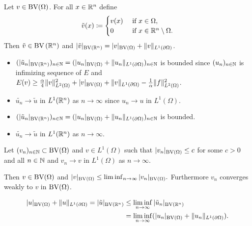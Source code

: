 \documentclass[xcolor=svgnames,english]{beamer}
\begin{document}
\begin{frame}

  \begin{block}{}
    Let $v\in\textup{BV}(\Omega)$.
    For all $x\in\mathbb{R}^n$ define
    \begin{align*}
      \tilde{v}(x)\coloneqq
      \begin{cases}
        v(x)  &\text{ if } x\in\Omega,\\
        0     &\text{ if } x\in\mathbb{R}^n\setminus\Omega.
      \end{cases} 
    \end{align*}
    Then $\tilde{v}\in\textup{BV}\left(\mathbb{R}^n\right)$ and
    $|\tilde{v}|_{\textup{BV}\left(\mathbb{R}^n\right)}
    = |v|_{\textup{BV}(\Omega)}+\Vert v\Vert_{L^1(\partial\Omega)}$.
  \end{block}

  \pause 
  \begin{itemize}[label=$\bullet$]
    \item 
      $(|\tilde{u}_n|_{\textup{BV}(\mathbb{R}^n)})_{n\in\mathbb{N}} = (|u_n|_{\textup{BV}(\Omega)}+\Vert
      u_n\Vert_{L^1(\partial\Omega)})_{n\in\mathbb{N}}$ is bounded since 
      $(u_n)_{n\in\mathbb{N}}$ is infimizing sequence of $E$ and
      $E(v)\geq 
      \frac{\alpha}{4}\Vert v\Vert_{L^2(\Omega)}^2 + |v|_{\textup{BV}(\Omega)}
      +\Vert v\Vert_{L^1(\partial\Omega)}-\frac{1}{\alpha}\Vert
      f\Vert_{L^2(\Omega)}^2$.
      \pause
    \item $\tilde{u_n}\to\tilde{u}$ in $L^1(\mathbb{R}^n)$ as $n\to\infty$ since
      $u_n\to u$ in $L^1(\Omega)$.
  \end{itemize}
\end{frame}

\begin{frame}
  \begin{itemize}[label=$\bullet$]
    \item 
      $(|\tilde{u}_n|_{\textup{BV}(\mathbb{R}^n)})_{n\in\mathbb{N}} = (|u_n|_{\textup{BV}(\Omega)}+\Vert
      u_n\Vert_{L^1(\partial\Omega)})_{n\in\mathbb{N}}$ is bounded.
      \pause
    \item $\tilde{u_n}\to\tilde{u}$ in $L^1(\mathbb{R}^n)$ as $n\to\infty$.
  \end{itemize}
  \pause
  \begin{block}{}
    Let $(v_n)_{n\in\mathbb{N}}\subset\textup{BV}(\Omega)$ and $v\in L^1(\Omega)$ such that
    $|v_n|_{\textup{BV}(\Omega)}\leq c$ for some $c>0$ and all $n\in\mathbb{N}$ and
    $v_n\rightarrow v$ in $L^1(\Omega)$ as $n\rightarrow\infty$.

    Then $v\in\textup{BV}(\Omega)$ and $|v|_{\textup{BV}(\Omega)}\leq
    \liminf_{n\rightarrow\infty}|v_n|_{\textup{BV}(\Omega)}.$
    Furthermore $v_n$ converges weakly to $v$ in $\textup{BV}(\Omega)$.
  \end{block}
  \pause
  \begin{align*}
    |u|_{\textup{BV}(\Omega)} +\Vert u\Vert_{L^1(\partial\Omega)}
    = |\tilde{u}|_{\textup{BV}(\mathbb{R}^n)}
    &\leq\liminf_{n\to\infty} |\tilde{u}_n|_{\textup{BV}(\mathbb{R}^n)}\\
    &= \liminf_{n\to\infty} (|u_n|_{\textup{BV}(\Omega)} +
    \Vert u_n\Vert_{L^1(\partial\Omega)}).
  \end{align*}
\end{frame}
\end{document}

